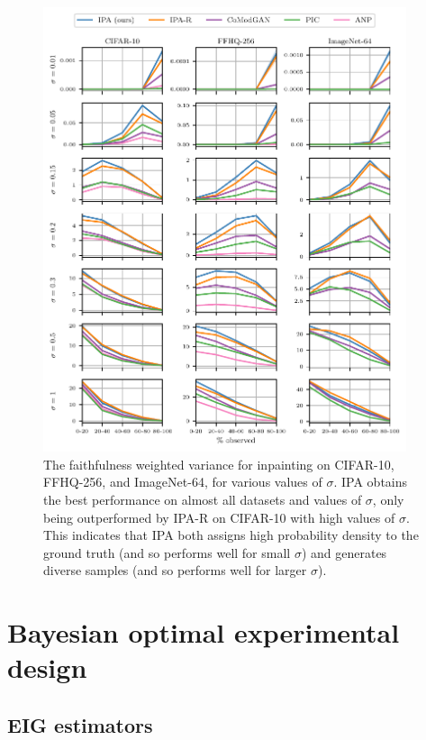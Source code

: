 \begin{figure}
  \includegraphics[width=0.95\textwidth]{figs/cigcvae/fwv_sigma}
  \caption{The faithfulness weighted variance for inpainting on CIFAR-10,
    FFHQ-256, and ImageNet-64, for various values of $\sigma$. IPA obtains the
    best performance on almost all datasets and values of $\sigma$, only being
    outperformed by IPA-R on CIFAR-10 with high values of $\sigma$. This
    indicates that IPA both assigns high probability density to the ground truth
    (and so performs well for small $\sigma$) and generates diverse samples (and
    so performs well for larger $\sigma$).}
  \label{fig:cigcvae-fwv}
\end{figure}



\section{Bayesian optimal experimental design} \label{sec:cigcvae-supp-boed}

\subsection{EIG estimators}  \label{sec:cigcvae-eig-estimator}

